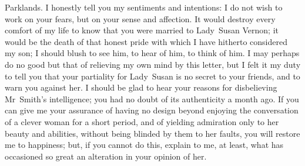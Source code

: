 \begin{mail}{Parklands.}{}
I honestly tell you my sentiments and intentions: I do not wish to work on your fears, but on your sense and affection. It would destroy every comfort of my life to know that you were married to Lady~Susan Vernon; it would be the death of that honest pride with which I have hitherto considered my son; I should blush to see him, to hear of him, to think of him. I may perhaps do no good but that of relieving my own mind by this letter, but I felt it my duty to tell you that your partiality for Lady~Susan is no secret to your friends, and to warn you against her. I should be glad to hear your reasons for disbelieving Mr~Smith's intelligence; you had no doubt of its authenticity a month ago. If you can give me your assurance of having no design beyond enjoying the conversation of a clever woman for a short period, and of yielding admiration only to her beauty and abilities, without being blinded by them to her faults, you will restore me to happiness; but, if you cannot do this, explain to me, at least, what has occasioned so great an alteration in your opinion of her. 

\end{mail}